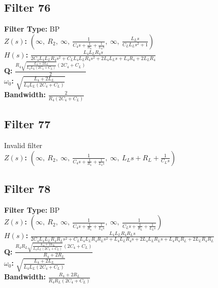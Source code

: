 \documentclass{article}
\begin{document}
\subsection*{Filter 76}
\textbf{Filter Type:} BP \\ 
\textbf{$Z(s)$:} $\left( \infty, \  R_{2}, \  \infty, \  \frac{1}{C_{4} s + \frac{1}{R_{4}} + \frac{1}{L_{4} s}}, \  \infty, \  \frac{L_{L} s}{C_{L} L_{L} s^{2} + 1}\right)$ \\ 
\textbf{$H(s)$:} $\frac{L_{4} L_{L} R_{4} s}{2 C_{4} L_{4} L_{L} R_{4} s^{2} + C_{L} L_{4} L_{L} R_{4} s^{2} + 2 L_{4} L_{L} s + L_{4} R_{4} + 2 L_{L} R_{4}}$ \\ 
\textbf{Q:} $\frac{R_{4} \sqrt{\frac{L_{4} + 2 L_{L}}{L_{4} L_{L} \left(2 C_{4} + C_{L}\right)}} \left(2 C_{4} + C_{L}\right)}{2}$ \\ 
\textbf{$\omega_0$:} $\sqrt{\frac{L_{4} + 2 L_{L}}{L_{4} L_{L} \left(2 C_{4} + C_{L}\right)}}$ \\ 
\textbf{Bandwidth:} $\frac{2}{R_{4} \left(2 C_{4} + C_{L}\right)}$ \\ 
\subsection*{Filter 77}
Invalid filter \\ 
\textbf{$Z(s)$:} $\left( \infty, \  R_{2}, \  \infty, \  \frac{1}{C_{4} s + \frac{1}{R_{4}} + \frac{1}{L_{4} s}}, \  \infty, \  L_{L} s + R_{L} + \frac{1}{C_{L} s}\right)$ \\ 
\subsection*{Filter 78}
\textbf{Filter Type:} BP \\ 
\textbf{$Z(s)$:} $\left( \infty, \  R_{2}, \  \infty, \  \frac{1}{C_{4} s + \frac{1}{R_{4}} + \frac{1}{L_{4} s}}, \  \infty, \  \frac{1}{C_{L} s + \frac{1}{R_{L}} + \frac{1}{L_{L} s}}\right)$ \\ 
\textbf{$H(s)$:} $\frac{L_{4} L_{L} R_{4} R_{L} s}{2 C_{4} L_{4} L_{L} R_{4} R_{L} s^{2} + C_{L} L_{4} L_{L} R_{4} R_{L} s^{2} + L_{4} L_{L} R_{4} s + 2 L_{4} L_{L} R_{L} s + L_{4} R_{4} R_{L} + 2 L_{L} R_{4} R_{L}}$ \\ 
\textbf{Q:} $\frac{R_{4} R_{L} \sqrt{\frac{L_{4} + 2 L_{L}}{L_{4} L_{L} \left(2 C_{4} + C_{L}\right)}} \left(2 C_{4} + C_{L}\right)}{R_{4} + 2 R_{L}}$ \\ 
\textbf{$\omega_0$:} $\sqrt{\frac{L_{4} + 2 L_{L}}{L_{4} L_{L} \left(2 C_{4} + C_{L}\right)}}$ \\ 
\textbf{Bandwidth:} $\frac{R_{4} + 2 R_{L}}{R_{4} R_{L} \left(2 C_{4} + C_{L}\right)}$ \\ 
\end{document}
